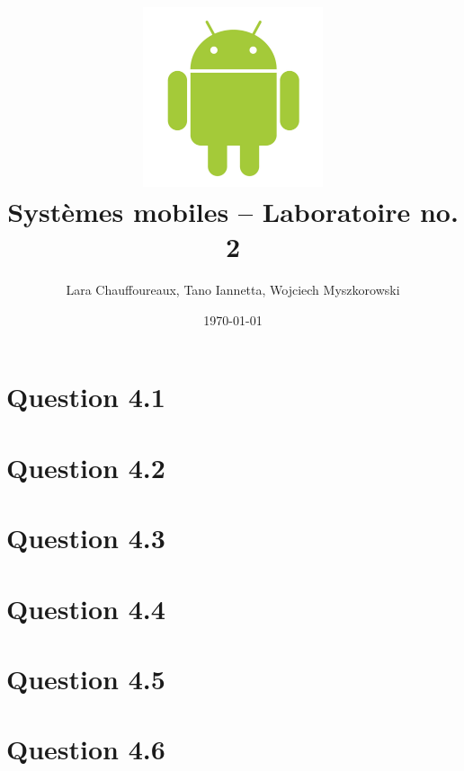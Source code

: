 \documentclass[12pt]{article}
\title{\includegraphics[width=200px]{title}\\
  \vspace{40 mm}
  \huge{Systèmes mobiles -- Laboratoire no. 2}
\vspace{20 mm}
}
\author{Lara Chauffoureaux, Tano Iannetta, Wojciech Myszkorowski}
\date{\today}
\begin{document}
\maketitle
\thispagestyle{empty}
\clearpage

\section{Question 4.1}

\section{Question 4.2}

\section{Question 4.3}

\section{Question 4.4}

\section{Question 4.5}

\section{Question 4.6}
\end{document}
